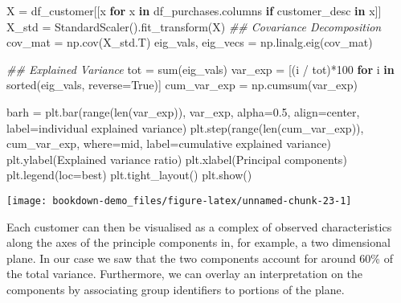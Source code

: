 \documentclass[]{tufte-book}
\newenvironment{Shaded}{}{}
\newcommand{\BuiltInTok}[1]{#1}
\newcommand{\CommentTok}[1]{\textcolor[rgb]{0.38,0.63,0.69}{\textit{#1}}}
\newcommand{\ControlFlowTok}[1]{\textcolor[rgb]{0.00,0.44,0.13}{\textbf{#1}}}
\newcommand{\DecValTok}[1]{\textcolor[rgb]{0.25,0.63,0.44}{#1}}
\newcommand{\FloatTok}[1]{\textcolor[rgb]{0.25,0.63,0.44}{#1}}
\newcommand{\KeywordTok}[1]{\textcolor[rgb]{0.00,0.44,0.13}{\textbf{#1}}}
\newcommand{\NormalTok}[1]{#1}
\newcommand{\OperatorTok}[1]{\textcolor[rgb]{0.40,0.40,0.40}{#1}}
\newcommand{\StringTok}[1]{\textcolor[rgb]{0.25,0.44,0.63}{#1}}
\newcommand{\VariableTok}[1]{\textcolor[rgb]{0.10,0.09,0.49}{#1}}
\theoremstyle{definition}
\theoremstyle{definition}
\theoremstyle{definition}
\theoremstyle{remark}
\begin{document}
\begin{Shaded}
\begin{Highlighting}[]
\NormalTok{X }\OperatorTok{=}\NormalTok{ df\_customer[[x }\ControlFlowTok{for}\NormalTok{ x }\KeywordTok{in}\NormalTok{ df\_purchases.columns }
\ControlFlowTok{if} \StringTok{\textquotesingle{}customer\_desc\textquotesingle{}} \KeywordTok{in}\NormalTok{ x]]}
\NormalTok{X\_std }\OperatorTok{=}\NormalTok{ StandardScaler().fit\_transform(X)}
\CommentTok{\#\# Covariance Decomposition}
\NormalTok{cov\_mat }\OperatorTok{=}\NormalTok{ np.cov(X\_std.T)}
\NormalTok{eig\_vals, eig\_vecs }\OperatorTok{=}\NormalTok{ np.linalg.eig(cov\_mat)}

\CommentTok{\#\# Explained Variance}
\NormalTok{tot }\OperatorTok{=} \BuiltInTok{sum}\NormalTok{(eig\_vals)}
\NormalTok{var\_exp }\OperatorTok{=}\NormalTok{ [(i }\OperatorTok{/}\NormalTok{ tot)}\OperatorTok{*}\DecValTok{100} \ControlFlowTok{for}\NormalTok{ i }\KeywordTok{in} \BuiltInTok{sorted}\NormalTok{(eig\_vals, reverse}\OperatorTok{=}\VariableTok{True}\NormalTok{)]}
\NormalTok{cum\_var\_exp }\OperatorTok{=}\NormalTok{ np.cumsum(var\_exp)}

\NormalTok{barh }\OperatorTok{=}\NormalTok{ plt.bar(}\BuiltInTok{range}\NormalTok{(}\BuiltInTok{len}\NormalTok{(var\_exp)), var\_exp, alpha}\OperatorTok{=}\FloatTok{0.5}\NormalTok{, align}\OperatorTok{=}\StringTok{\textquotesingle{}center\textquotesingle{}}\NormalTok{,}
\NormalTok{        label}\OperatorTok{=}\StringTok{\textquotesingle{}individual explained variance\textquotesingle{}}\NormalTok{)}
\NormalTok{plt.step(}\BuiltInTok{range}\NormalTok{(}\BuiltInTok{len}\NormalTok{(cum\_var\_exp)), cum\_var\_exp, where}\OperatorTok{=}\StringTok{\textquotesingle{}mid\textquotesingle{}}\NormalTok{,}
\NormalTok{         label}\OperatorTok{=}\StringTok{\textquotesingle{}cumulative explained variance\textquotesingle{}}\NormalTok{)}
\NormalTok{plt.ylabel(}\StringTok{\textquotesingle{}Explained variance ratio\textquotesingle{}}\NormalTok{)}
\NormalTok{plt.xlabel(}\StringTok{\textquotesingle{}Principal components\textquotesingle{}}\NormalTok{)}
\NormalTok{plt.legend(loc}\OperatorTok{=}\StringTok{\textquotesingle{}best\textquotesingle{}}\NormalTok{)}
\NormalTok{plt.tight\_layout()}
\NormalTok{plt.show()}
\end{Highlighting}
\end{Shaded}

\texttt{[image: bookdown-demo\_files/figure-latex/unnamed-chunk-23-1]}

Each customer can then be visualised as a complex of observed characteristics along the axes of the principle components in, for example, a two dimensional plane. In our case we saw that the two components account for around 60\% of the total variance. Furthermore, we can overlay an interpretation on the components by associating group identifiers to portions of the plane.
\end{document}

